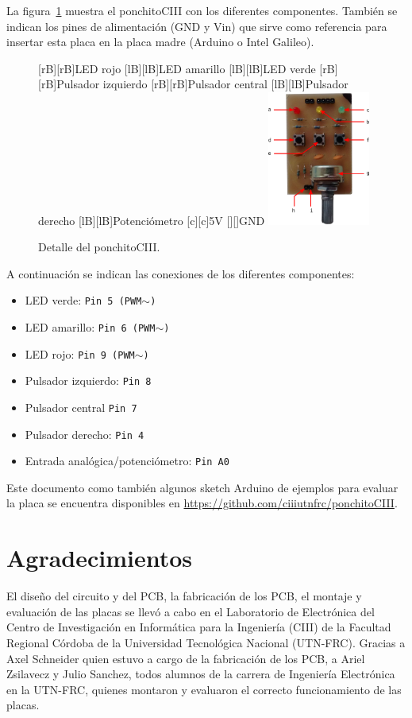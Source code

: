 \documentclass[a4paper]{article}
\begin{document}
La figura~\ref{fig:ponchito} muestra el ponchitoCIII con los diferentes componentes.
También se indican los pines de alimentación (GND y Vin) que sirve como referencia para insertar esta placa en la placa madre (Arduino o Intel Galileo).
\begin{figure}[hbt]
  \centering
  [rB][rB]{LED rojo}
  [lB][lB]{LED amarillo}
  [lB][lB]{LED verde}
  [rB][rB]{Pulsador izquierdo}
  [rB][rB]{Pulsador central}
  [lB][lB]{Pulsador derecho}
  [lB][lB]{Potenciómetro}
  [c][c]{5V}
  [][]{GND}
  \includegraphics[width=0.30\textwidth]{ponchito.eps}
  \caption{Detalle del ponchitoCIII.}
  \label{fig:ponchito}
\end{figure}

\bigskip
A continuación se indican las conexiones de los diferentes componentes:
\begin{itemize}
  \item  LED verde: \texttt{Pin 5 (PWM$\sim$)}
  \item  LED amarillo: \texttt{Pin 6 (PWM$\sim$)}
  \item  LED rojo: \texttt{Pin 9 (PWM$\sim$)}
  \item  Pulsador izquierdo: \texttt{Pin 8}
  \item  Pulsador central \texttt{Pin 7}
  \item  Pulsador derecho: \texttt{Pin 4}
  \item  Entrada analógica/potenciómetro: \texttt{Pin A0}
\end{itemize}

Este documento como también algunos sketch Arduino de ejemplos para evaluar la placa se encuentra disponibles en \href{https://github.com/ciiiutnfrc/ponchitoCIII}{https://github.com/ciiiutnfrc/ponchitoCIII}.

\section*{Agradecimientos}
El diseño del circuito y del PCB, la fabricación de los PCB, el montaje y evaluación de las placas se llevó a cabo en el Laboratorio de Electrónica del Centro de Investigación en Informática para la Ingeniería (CIII) de la Facultad Regional Córdoba de la Universidad Tecnológica Nacional (UTN-FRC).
Gracias a Axel Schneider quien estuvo a cargo de la fabricación de los PCB, a Ariel Zsilavecz y Julio Sanchez, todos alumnos de la carrera de Ingeniería Electrónica en la UTN-FRC, quienes montaron y evaluaron el correcto funcionamiento de las placas.
\end{document}
